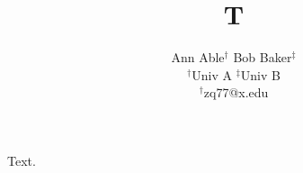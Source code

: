 \documentclass{article}
\title{T}
\author{Ann Able$^{\dagger}$ \quad Bob Baker$^{\ddagger}$ \\ $^\dagger$Univ A \quad $^\ddagger$Univ B \\ $^\dagger$zq77@x.edu}
\begin{document}
\maketitle
Text.
\end{document}
